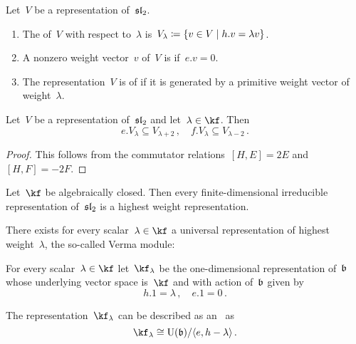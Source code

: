 \documentclass[a4paper, 11pt, oneside]{scrartcl}
\begin{document}
\begin{definition}
  Let~$V$ be a representation of~$\mathfrak{sl}_2$.
  \begin{enumerate}
    \item
      The  of~$V$ with respect to~$\lambda$ is~$V_\lambda \defined \{ v \in V \suchthat h.v = \lambda v \}$.
    \item
      A nonzero weight vector~$v$ of~$V$ is  if~$e.v = 0$.
    \item
      The representation~$V$ is of  if it is generated by a primitive weight vector of weight~$\lambda$.
  \end{enumerate}
\end{definition}

\begin{proposition}
  \label{shifting lemma}
  Let~$V$ be a representation of~$\mathfrak{sl}_2$ and let~$\lambda \in \kf$.
  Then
  \[
    e.V_\lambda
    \subseteq
    V_{\lambda + 2} \,,
    \quad
    f.V_\lambda
    \subseteq
    V_{\lambda - 2} \,.
  \]
\end{proposition}

\begin{proof}
  This follows from the commutator relations~$[H,E] = 2E$ and~$[H,F] = -2F$.
\end{proof}

\begin{lemma}
  Let~$\kf$ be algebraically closed.
  Then every finite-dimensional irreducible representation of~$\mathfrak{sl}_2$ is a highest weight representation.
\end{lemma}

There exists for every scalar~$\lambda \in \kf$ a universal representation of highest weight~$\lambda$, the so-called Verma module: 

\begin{definition}
  For every scalar~$\lambda \in \kf$ let~$\kf_\lambda$ be the one-dimensional representation of~$\mathfrak{b}$ whose underlying vector space is~$\kf$ and with action of~$\mathfrak{b}$ given by
  \[
    h.1 = \lambda \,,
    \quad
    e.1 = 0 \,.
  \]
\end{definition}

\begin{lemma}
  The representation~$\kf_\lambda$ can be described as an~\module{$\Univ(\blie)$} as
  \[
    \kf_\lambda
    \cong
    \Univ(\blie)
    /
    \gen{e, h - \lambda} \,.
  \]
\end{lemma}
\end{document}
